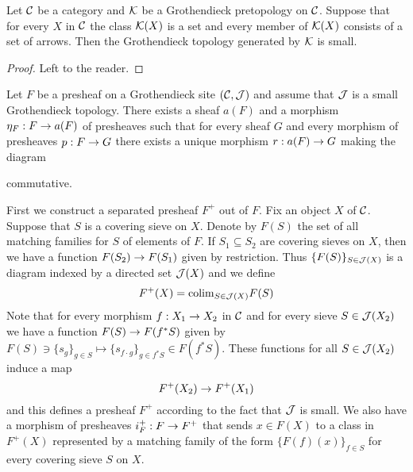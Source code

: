 \begin{fact}
Let ${\mathcal C}$ be a category and ${\mathcal K}$ be a Grothendieck pretopology on ${\mathcal C}$. Suppose that for every $X$ in ${\mathcal C}$ the class ${\mathcal K}(X)$ is a set and every member of ${\mathcal K}(X)$ consists of a set of arrows. Then the Grothendieck topology generated by ${\mathcal K}$ is small.
\end{fact}
\begin{proof}
Left to the reader.
\end{proof}

\begin{theorem}\label{theorem:associatedsheaf}
Let $F$ be a presheaf on a Grothendieck site $({\mathcal C},{\mathcal J})$ and assume that ${\mathcal J}$ is a small Grothendieck topology. There exists a sheaf $a(F)$ and a morphism $\eta_F:F \rightarrow a(F)$ of presheaves such that for every sheaf $G$ and every morphism of presheaves $p:F \rightarrow G$ there exists a unique morphism $r:a(F)\rightarrow G$ making the diagram
\begin{center}
\end{center}
commutative.
\end{theorem}
\noindent
First we construct a separated presheaf $F^+$ out of $F$. Fix an object $X$ of ${\mathcal C}$. Suppose that $S$ is a covering sieve on $X$. Denote by $F(S)$ the set of all matching families for $S$ of elements of $F$. If $S_1\subseteq S_2$ are covering sieves on $X$, then we have a function $F(S_2)\rightarrow F(S_1)$ given by restriction. Thus $\{F(S)\}_{S\in {\mathcal J}(X)}$ is a diagram indexed by a directed set ${\mathcal J}(X)$ and we define
$$F^+(X)=\mathrm{colim}_{S\in {\mathcal J}(X)}F(S)$$
Note that for every morphism $f:X_1\rightarrow X_2$ in ${\mathcal C}$ and for every sieve $S\in {\mathcal J}(X_2)$ we have a function $F(S)\rightarrow F(f^*S)$ given by $F(S)\ni \{s_g\}_{g\in S}\mapsto \{s_{f\cdot g}\}_{g\in f^*S}\in F(f^*S)$. These functions for all $S\in {\mathcal J}(X_2)$ induce a map
$$F^+(X_2)\rightarrow F^+(X_1)$$
and this defines a presheaf $F^+$ according to the fact that ${\mathcal J}$ is small. We also have a morphism of presheaves $i_F^+:F\rightarrow F^+$ that sends $x\in F(X)$ to a class in $F^+(X)$ represented by a matching family of the form $\{F(f)(x)\}_{f\in S}$ for every covering sieve $S$ on $X$.
